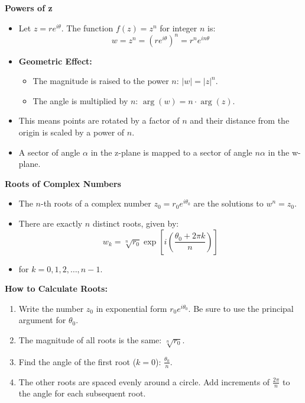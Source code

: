 \documentclass{../cheatsheet}
\begin{document}
\begin{multicols}{3}
\textbf{Powers of z}
\begin{itemize}
    \item Let $z = re^{i\theta}$. The function $f(z)=z^n$ for integer $n$ is:
    $$w = z^n = (re^{i\theta})^n = r^n e^{in\theta}$$
    \item \textbf{Geometric Effect:}
        \begin{itemize}
            \item The magnitude is raised to the power $n$: $|w| = |z|^n$.
            \item The angle is multiplied by $n$: $\arg(w) = n \cdot \arg(z)$.
        \end{itemize}
    \item This means points are rotated by a factor of $n$ and their distance from the origin is scaled by a power of $n$.
    \item A sector of angle $\alpha$ in the z-plane is mapped to a sector of angle $n\alpha$ in the w-plane.
\end{itemize}

\textbf{Roots of Complex Numbers}
\begin{itemize}
    \item The $n$-th roots of a complex number $z_0 = r_0e^{i\theta_0}$ are the solutions to $w^n = z_0$.
    \item There are exactly $n$ distinct roots, given by:
    $$w_k = \sqrt[n]{r_0} \exp\left[i\left(\frac{\theta_0 + 2\pi k}{n}\right)\right]$$
    \item for $k = 0, 1, 2, \dots, n-1$.
\end{itemize}
\textbf{How to Calculate Roots:}
\begin{enumerate}
    \item Write the number $z_0$ in exponential form $r_0e^{i\theta_0}$. Be sure to use the principal argument for $\theta_0$.
    \item The magnitude of all roots is the same: $\sqrt[n]{r_0}$.
    \item Find the angle of the first root ($k=0$): $\frac{\theta_0}{n}$.
    \item The other roots are spaced evenly around a circle. Add increments of $\frac{2\pi}{n}$ to the angle for each subsequent root.
\end{enumerate}


\end{multicols}
\end{document}
